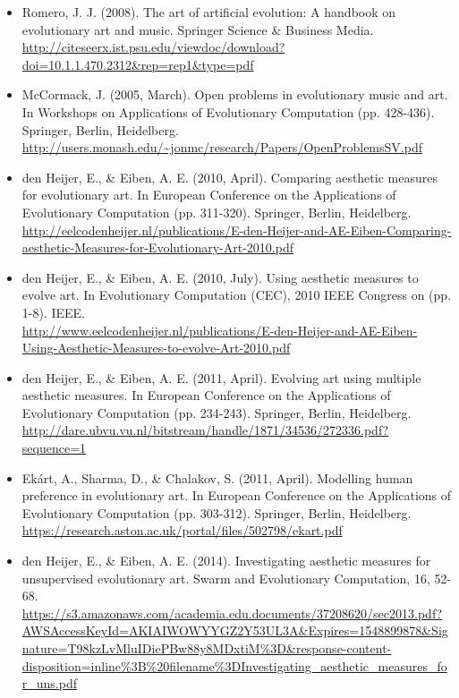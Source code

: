 \documentclass[10pt,a4paper]{article}
\begin{document}
\begin{itemize}
	\item Romero, J. J. (2008). The art of artificial evolution: A handbook on evolutionary art and music. Springer Science \& Business Media.
	\\
	\url{http://citeseerx.ist.psu.edu/viewdoc/download?doi=10.1.1.470.2312&rep=rep1&type=pdf}
	
	\item McCormack, J. (2005, March). Open problems in evolutionary music and art. In Workshops on Applications of Evolutionary Computation (pp. 428-436). Springer, Berlin, Heidelberg.
	\\
	\url{http://users.monash.edu/~jonmc/research/Papers/OpenProblemsSV.pdf}
	
	\item den Heijer, E., \& Eiben, A. E. (2010, April). Comparing aesthetic measures for evolutionary art. In European Conference on the Applications of Evolutionary Computation (pp. 311-320). Springer, Berlin, Heidelberg.
	\\
	\url{http://eelcodenheijer.nl/publications/E-den-Heijer-and-AE-Eiben-Comparing-aesthetic-Measures-for-Evolutionary-Art-2010.pdf}
	
	\item den Heijer, E., \& Eiben, A. E. (2010, July). Using aesthetic measures to evolve art. In Evolutionary Computation (CEC), 2010 IEEE Congress on (pp. 1-8). IEEE.
	\\
	\url{http://www.eelcodenheijer.nl/publications/E-den-Heijer-and-AE-Eiben-Using-Aesthetic-Measures-to-evolve-Art-2010.pdf}
	
	\item den Heijer, E., \& Eiben, A. E. (2011, April). Evolving art using multiple aesthetic measures. In European Conference on the Applications of Evolutionary Computation (pp. 234-243). Springer, Berlin, Heidelberg.
	\\
	\url{http://dare.ubvu.vu.nl/bitstream/handle/1871/34536/272336.pdf?sequence=1}
	
	\item Ekárt, A., Sharma, D., \& Chalakov, S. (2011, April). Modelling human preference in evolutionary art. In European Conference on the Applications of Evolutionary Computation (pp. 303-312). Springer, Berlin, Heidelberg.
	\\
	\url{https://research.aston.ac.uk/portal/files/502798/ekart.pdf}
	
	\item den Heijer, E., \& Eiben, A. E. (2014). Investigating aesthetic measures for unsupervised evolutionary art. Swarm and Evolutionary Computation, 16, 52-68.
	\\
	\url{https://s3.amazonaws.com/academia.edu.documents/37208620/sec2013.pdf?AWSAccessKeyId=AKIAIWOWYYGZ2Y53UL3A&Expires=1548899878&Signature=T98kzLvMluIDiePBw88y8MDxtiM%3D&response-content-disposition=inline%3B%20filename%3DInvestigating_aesthetic_measures_for_uns.pdf}
	

\end{itemize}
\end{document}
